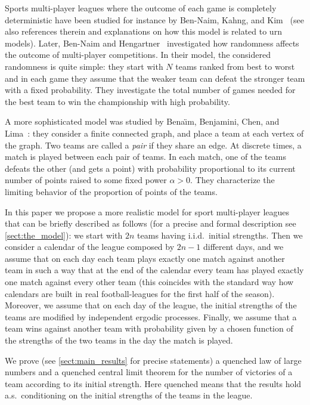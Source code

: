 \documentclass[11pt,a4paper,oneside]{article}
\theoremstyle{definition}
\theoremstyle{remark}
\begin{document}
Sports multi-player leagues where the outcome of each game is completely deterministic have been studied for instance by Ben-Naim, Kahng, and Kim~\cite{ben2006dynamics} (see also references therein and explanations on how this model is related to urn models). Later, Ben-Naim and Hengartner~\cite{ben2007efficiency} investigated how randomness affects the outcome of multi-player competitions. In their model, the considered randomness is quite simple: they start with $N$ teams ranked from best
to worst and in each game they assume that the weaker team
can defeat the stronger team with a fixed probability. They investigate the total number of games needed for the best team to win the championship with high probability.

A more sophisticated model was studied by Bena\"{\i}m, Benjamini, Chen, and Lima~\cite{MR3346459}: they consider a finite connected graph, and place a team at each vertex of the graph. Two
teams are called a \emph{pair} if they share an edge. At discrete times, a match is
played between each pair of teams. In each match, one of the teams defeats the other (and gets a point) with
probability proportional to its current number of points raised to some fixed
power $\alpha>0$. They characterize the limiting behavior of the proportion of points
of the teams.

In this paper we propose a more realistic model for sport multi-player leagues that can be briefly described as follows (for a precise and formal description see \cref{sect:the_model}): we start with $2n$ teams having i.i.d.\ initial strengths. Then we consider a calendar of the league composed by $2n-1$ different days, and we assume that on each day each team plays exactly one match against another team in such a way that at the end of the calendar every team has played exactly one match against every other team (this coincides with the standard way how calendars are built in real football-leagues for the first half of the season). Moreover, we assume that on each day of the league, the initial strengths of the teams are modified by independent ergodic processes. Finally, we assume that a team wins against another team with probability given by a chosen function of the strengths of the two teams in the day the match is played.

We prove (see \cref{sect:main_results} for precise statements) a quenched law of large numbers and a quenched central limit theorem for the number of victories of a team according to its initial strength. Here quenched means that the results hold a.s.\ conditioning on the initial strengths of the teams in the league. 
\end{document}
